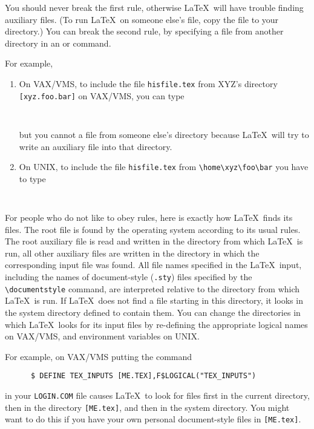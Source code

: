 You should never break the first rule, otherwise \LaTeX\ will have
trouble finding auxiliary files.  (To run \LaTeX\ on someone else's
file, copy the file to your directory.) You can break the second
rule, by specifying a file from another directory in an
\hbox{\verb||} or \hbox{\verb||} command.

For example, 
\begin{enumerate}
\item On VAX/VMS, to include the file \mbox{\tt hisfile.tex} 
from XYZ's directory \hbox{\verb|[xyz.foo.bar]|} on VAX/VMS, you can type
\begin{verbatim}
      
\end{verbatim}
but you cannot \hbox{\verb||} a file from someone else's directory
because \LaTeX\ will try to write an auxiliary file into that directory.

\item On UNIX, to include the file \mbox{\tt hisfile.tex} from 
\hbox{\verb|\home\xyz\foo\bar|} you have to type
\begin{verbatim}
      
\end{verbatim}
 
\end{enumerate}

For people who do not like to obey rules, here is exactly how \LaTeX\ finds its
files.  The root file is found by the operating system according to its usual
rules. The root auxiliary file is read and written in the directory from which
\LaTeX\ is run, all other auxiliary files are written in the directory in which
the corresponding input file was found. All file names specified in the \LaTeX\
input, including the names of document-style (\mbox{\tt .sty}) files specified
by the \hbox{\verb|\documentstyle|} command, are interpreted relative to the
directory from which \LaTeX\ is run.  If \LaTeX\ does not find a file starting
in this directory, it looks in the system directory defined to contain them. 
You can change the directories in which \LaTeX\ looks for its input files by
re-defining the appropriate logical names on VAX/VMS, and environment 
variables on UNIX. 

For example, on VAX/VMS putting the command
\begin{verbatim} 
      $ DEFINE TEX_INPUTS [ME.TEX],F$LOGICAL("TEX_INPUTS")
\end{verbatim}
in your \mbox{\tt LOGIN.COM} file causes \LaTeX\ to look for files
first in the current directory, then in the directory \mbox{\tt [ME.tex]},
and then in the system directory.  You might want to do this if
you have your own personal document-style files in \mbox{\tt [ME.tex]}.

